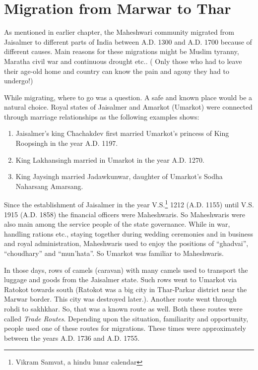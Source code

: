 \chapter{Migration from Marwar to Thar}
As mentioned in earlier chapter, the Maheshwari community migrated from Jaisalmer to different parts of India between A.D. 1300 and A.D. 1700 because of different causes. Main reasons for these migrations might be Muslim tyranny, Maratha civil war and continuous drought etc.. ( Only those who had to leave their age-old home and country can know the pain and agony they had to undergo!)

While migrating, where to go was a question. A safe and known place would be a natural choice. Royal states of Jaisalmer and Amarkot (Umarkot) were connected through marriage relationships as the following examples shows:
\begin{enumerate}
 \item Jaisalmer's king Chachakdev first married Umarkot's princess of King Roopsingh in the year A.D. 1197.
\item King Lakhansingh married in Umarkot in the year A.D. 1270.
\item King Jaysingh married Jadawkunwar, daughter of Umarkot's Sodha Naharsang Amarsang.
\end{enumerate}

Since the establishment of Jaisalmer in the year V.S.\footnote{Vikram Samvat, a hindu lunar calendar} 1212 (A.D. 1155) until V.S. 1915 (A.D. 1858) the financial officers were Maheshwaris. So Maheshwaris were also main among the service people of the state governance. While in war, handling rations etc., staying together during wedding ceremonies and in business and royal administration, Maheshwaris used to enjoy the positions of ``ghadvai'', ``choudhary'' and ``mun'hata''. So Umarkot was familiar to Maheshwaris.

In those days, rows of camels (caravan) with many camels used to transport the luggage and goods from the Jaisalmer state. Such rows went to Umarkot via Ratokot towards south (Ratokot was a big city in Thar-Parkar district near the Marwar border. This city was destroyed later.). Another route went through rohdi to sakhkhar. So, that was a known route as well. Both these routes were called \textit{Trade Routes}. Depending upon the situation, familiarity and opportunity, people used one of these routes for migrations. These times were approximately between the years A.D. 1736 and A.D. 1755.

